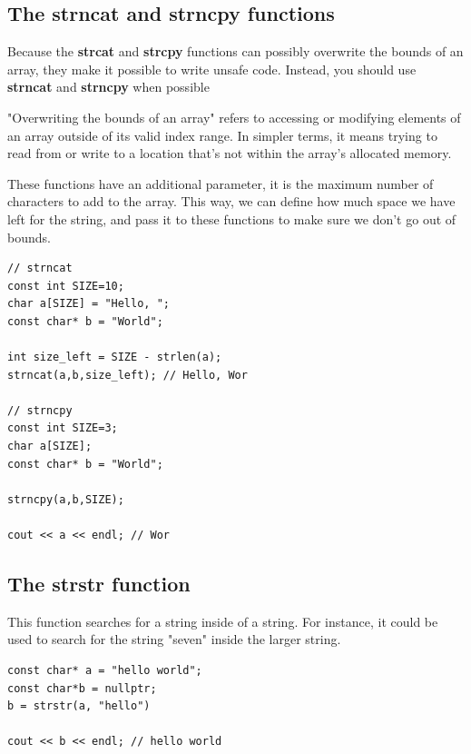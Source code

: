 \documentclass{report}
\begin{document}
    \subsection{The strncat and strncpy functions}
    \bigbreak \noindent 
    Because the \textbf{strcat} and \textbf{strcpy} functions can possibly overwrite the bounds of an array, they make it possible to write unsafe code. Instead, you should use \textbf{strncat} and \textbf{strncpy} when possible
    \bigbreak \noindent 
    \begin{remark}
       "Overwriting the bounds of an array" refers to accessing or modifying elements of an array outside of its valid index range. In simpler terms, it means trying to read from or write to a location that's not within the array's allocated memory.
    \end{remark}
    \bigbreak \noindent 
    These functions have an additional parameter, it is the maximum number of characters to add to the array. This way, we can define how much space we have left for the string, and pass it to these functions to make sure we don't go out of bounds.
    \bigbreak \noindent 
    \sepline
    \begin{verbatim}
// strncat
const int SIZE=10;
char a[SIZE] = "Hello, ";
const char* b = "World";

int size_left = SIZE - strlen(a);
strncat(a,b,size_left); // Hello, Wor

// strncpy
const int SIZE=3;
char a[SIZE];
const char* b = "World";

strncpy(a,b,SIZE);

cout << a << endl; // Wor
    \end{verbatim}
    \sepline

    \bigbreak \noindent 
    \subsection{The strstr function}
    \bigbreak \noindent 
    This function searches for a string inside of a string. For instance, it could be used to search for the string "seven" inside the larger string.
    \bigbreak \noindent 
    \sepline
    \begin{verbatim}
const char* a = "hello world";
const char*b = nullptr;
b = strstr(a, "hello")

cout << b << endl; // hello world
    \end{verbatim}
    \sepline
    \bigbreak \noindent 
    \bigbreak \noindent 
\end{document}
